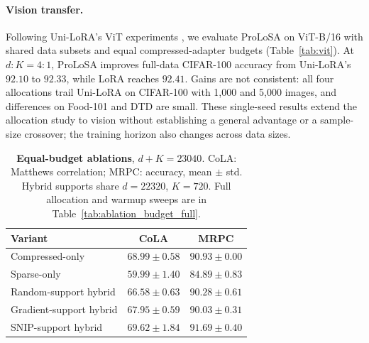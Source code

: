 \begin{table}[t]
 \centering\small
 \caption{\textbf{Vision transfer with ViT-B/16.} Final-model accuracy (\%, seed 42). All methods use rank 4 and train the classification head; adapter budgets exclude this shared head: LoRA has 147,456 parameters and both compressed methods have 24,600 ($d+K$ for ProLoSA). Parentheses give $d:K$. All four ratios are shown; no best-epoch or best-ratio selection is applied. Appendix~\ref{app:vit} gives exact budgets, settings, and the 72,000-budget sweep.}
 \label{tab:vit}
 \setlength{\tabcolsep}{5pt}
 
\end{table}

\paragraph{Vision transfer.}
Following Uni-LoRA's ViT experiments \citep{li2025unilora}, we evaluate ProLoSA on ViT-B/16 with shared data subsets and equal compressed-adapter budgets (Table~\ref{tab:vit}). At $d:K=4:1$, ProLoSA improves full-data CIFAR-100 accuracy from Uni-LoRA's $92.10$ to $92.33$, while LoRA reaches $92.41$. Gains are not consistent: all four allocations trail Uni-LoRA on CIFAR-100 with 1,000 and 5,000 images, and differences on Food-101 and DTD are small. These single-seed results extend the allocation study to vision without establishing a general advantage or a sample-size crossover; the training horizon also changes across data sizes.

\begin{table}[H]
 \centering\small
 \caption{\textbf{Equal-budget ablations}, $d+K=23040$. CoLA: Matthews correlation; MRPC: accuracy, mean $\pm$ std. Hybrid supports share $d=22320$, $K=720$. Full allocation and warmup sweeps are in Table~\ref{tab:ablation_budget_full}.}
 \label{main:tab_ablation}
 \begin{tabular}{lcc}
 \toprule
 Variant & CoLA & MRPC \\
 \midrule
 Compressed-only & $68.99\pm0.58$ & $90.93\pm0.00$ \\
 Sparse-only & $59.99\pm1.40$ & $84.89\pm0.83$ \\
 Random-support hybrid & $66.58\pm0.63$ & $90.28\pm0.61$ \\
 Gradient-support hybrid & $67.95\pm0.59$ & $90.03\pm0.31$ \\
 SNIP-support hybrid & $69.62\pm1.84$ & $91.69\pm0.40$ \\
 \bottomrule
 \end{tabular}
\end{table}

